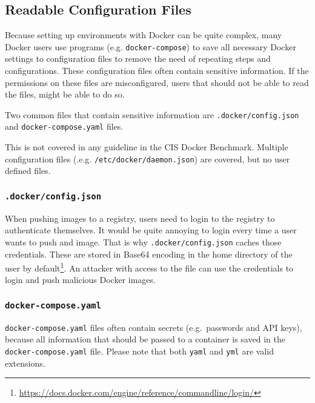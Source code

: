 \subsection{Readable Configuration Files}\label{subsection:config-files}
Because setting up environments with Docker can be quite complex, many Docker users use programs (e.g. \lstinline{docker-compose}) to save all necessary Docker settings to configuration files to remove the need of repeating steps and configurations. These configuration files often contain sensitive information. If the permissions on these files are misconfigured, users that should not be able to read the files, might be able to do so.

Two common files that contain sensitive information are \lstinline{.docker/config.json} and \lstinline{docker-compose.yaml} files.

\medskip

This is not covered in any guideline in the CIS Docker Benchmark. Multiple configuration files (.e.g. \lstinline{/etc/docker/daemon.json}) are covered, but no user defined files.

\subsubsection{\texorpdfstring{\lstinline{.docker/config.json}}{.docker/config.json}}\label{config-files:docker-config-json}
When pushing images to a registry, users need to login to the registry to authenticate themselves.
It would be quite annoying to login every time a user wants to push and image. That is why \lstinline{.docker/config.json} caches those credentials. These are stored in Base64 encoding in the home directory of the user by default\footnote{\url{https://docs.docker.com/engine/reference/commandline/login/}}. An attacker with access to the file can use the credentials to login and push malicious Docker images\cite{Docker-Credentials-Metasploit}.

\subsubsection{\texorpdfstring{\lstinline{docker-compose.yaml}}{docker-compose.yaml}}
\lstinline{docker-compose.yaml} files often contain secrets (e.g.\ passwords and API keys), because all information that should be passed to a container is saved in the \lstinline{docker-compose.yaml} file. Please note that both \lstinline{yaml} and \lstinline{yml} are valid extensions.
